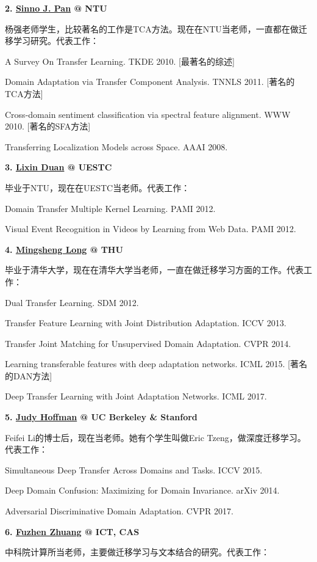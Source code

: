 \textbf{2. \href{http://www.cs.ust.hk/~qyang/}{Sinno J. Pan} @ NTU}

杨强老师学生，比较著名的工作是TCA方法。现在在NTU当老师，一直都在做迁移学习研究。代表工作：

A Survey On Transfer Learning. TKDE 2010. [最著名的综述]

Domain Adaptation via Transfer Component Analysis. TNNLS 2011. [著名的TCA方法]

Cross-domain sentiment classification via spectral feature alignment. WWW 2010. [著名的SFA方法]

Transferring Localization Models across Space. AAAI 2008.


\textbf{3. \href{http://www.lxduan.info/}{Lixin Duan} @ UESTC}

毕业于NTU，现在在UESTC当老师。代表工作：

Domain Transfer Multiple Kernel Learning. PAMI 2012.

Visual Event Recognition in Videos by Learning from Web Data. PAMI 2012.


\textbf{4. \href{http://ise.thss.tsinghua.edu.cn/~mlong/}{Mingsheng Long} @ THU}

毕业于清华大学，现在在清华大学当老师，一直在做迁移学习方面的工作。代表工作：

Dual Transfer Learning. SDM 2012.

Transfer Feature Learning with Joint Distribution Adaptation. ICCV 2013.

Transfer Joint Matching for Unsupervised Domain Adaptation. CVPR 2014.

Learning transferable features with deep adaptation networks. ICML 2015. [著名的DAN方法]

Deep Transfer Learning with Joint Adaptation Networks. ICML 2017.


\textbf{5. \href{http://people.eecs.berkeley.edu/~jhoffman/}{Judy Hoffman} @ UC Berkeley \& Stanford}

Feifei Li的博士后，现在当老师。她有个学生叫做Eric Tzeng，做深度迁移学习。代表工作：

Simultaneous Deep Transfer Across Domains and Tasks. ICCV 2015.

Deep Domain Confusion: Maximizing for Domain Invariance. arXiv 2014.

Adversarial Discriminative Domain Adaptation. CVPR 2017.


\textbf{6. \href{http://www.intsci.ac.cn/users/zhuangfuzhen/}{Fuzhen Zhuang} @ ICT, CAS}

中科院计算所当老师，主要做迁移学习与文本结合的研究。代表工作：

